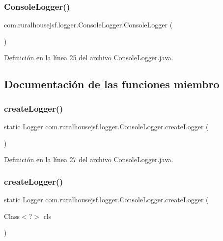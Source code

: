 \subsubsection{\texorpdfstring{ConsoleLogger()}{ConsoleLogger()}}
{\footnotesize\ttfamily com.\+ruralhousejsf.\+logger.\+Console\+Logger.\+Console\+Logger (\begin{DoxyParamCaption}{ }\end{DoxyParamCaption})\hspace{0.3cm}{\ttfamily [private]}}



Definición en la línea 25 del archivo Console\+Logger.\+java.



\subsection{Documentación de las funciones miembro}
\mbox{\label{a00220_a520321643663e37d95761134a35505cd}} 
\subsubsection{\texorpdfstring{createLogger()}{createLogger()}\hspace{0.1cm}{\footnotesize\ttfamily [1/6]}}
{\footnotesize\ttfamily static Logger com.\+ruralhousejsf.\+logger.\+Console\+Logger.\+create\+Logger (\begin{DoxyParamCaption}{ }\end{DoxyParamCaption})\hspace{0.3cm}{\ttfamily [static]}}



Definición en la línea 27 del archivo Console\+Logger.\+java.

\mbox{\label{a00220_a7260bb499fc46999ae7c583aa7227a9e}} 
\subsubsection{\texorpdfstring{createLogger()}{createLogger()}\hspace{0.1cm}{\footnotesize\ttfamily [2/6]}}
{\footnotesize\ttfamily static Logger com.\+ruralhousejsf.\+logger.\+Console\+Logger.\+create\+Logger (\begin{DoxyParamCaption}\item[{Class$<$?$>$}]{cls }\end{DoxyParamCaption})\hspace{0.3cm}{\ttfamily [static]}}



